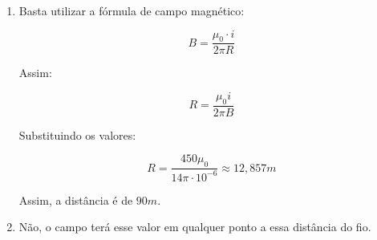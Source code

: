 \item 
\begin{enumerate}
\item
Basta utilizar a fórmula de campo magnético:

$$
B = \frac{\mu_0 \cdot i}{2 \pi R}
$$

Assim:

$$
R = \frac{\mu_0 i}{2 \pi B}
$$

Substituindo os valores:

$$
R = \frac{450 \mu_0}{14 \pi \cdot 10^{-6}} \approx 12,857m
$$

Assim, a distância é de $90m$.

\item
Não, o campo terá esse valor em qualquer ponto
a essa distância do fio.
\end{enumerate}